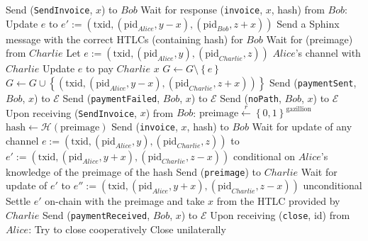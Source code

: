 \begin{algorithmic}[1]
      \State Send (\texttt{SendInvoice}, $x$) to $Bob$
      \State Wait for response (\texttt{invoice}, $x$, hash) from $Bob$:
        \State Update $e$ to $e' := \left(\mathrm{txid},
        \left(\mathrm{pid}_{Alice}, y - x\right),
        \left(\mathrm{pid}_{Bob}, z + x\right)\right)$ 
        \State Send a Sphinx~\cite{sphinx} message with the correct HTLCs (containing
        hash) for $Bob$
        \State {}
        \State Wait for (preimage) from $Charlie$
          \State Let $e := \left(\mathrm{txid}, \left(\mathrm{pid}_{Alice}, y\right),
          \left(\mathrm{pid}_{Charlie}, z\right)\right)$ $Alice$'s channel with $Charlie$
          \State Update $e$ to pay $Charlie$ $x$ 
          \State $G \leftarrow G \setminus \left\{e\right\}$
          \State $G \leftarrow G \cup \left\{\left(\mathrm{txid},
          \left(\mathrm{pid}_{Alice}, y - x\right), \left(\mathrm{pid}_{Charlie}, z +
          x\right)\right)\right\}$
          \State Send (\texttt{paymentSent}, $Bob$, $x$) to $\mathcal{E}$
        \Else
          \State Send (\texttt{paymentFailed}, $Bob$, $x$) to $\mathcal{E}$
        \EndIf
      \Else
        \State Send (\texttt{noPath}, $Bob$, $x$) to $\mathcal{E}$
      \EndIf
    \State
    \State Upon receiving (\texttt{SendInvoice}, $x$) from $Bob$:
      \State $\mathrm{preimage} \overset{r}{\leftarrow}
      \left\{0,1\right\}^{\mathrm{gazillion}}$
      \State $\mathrm{hash} \leftarrow \mathcal{H}\left(\mathrm{preimage}\right)$
      \State Send (\texttt{invoice}, $x$, hash) to $Bob$
      \State Wait for update of any channel $e := \left(\mathrm{txid},
      \left(\mathrm{pid}_{Alice}, y\right), \left(\mathrm{pid}_{Charlie}, z\right)\right)$
      to $e' := \left(\mathrm{txid}, \left(\mathrm{pid}_{Alice}, y + x\right),
      \left(\mathrm{pid}_{Charlie}, z - x\right)\right)$ conditional on $Alice$'s
      knowledge of the preimage of the hash
      \State Send (\texttt{preimage}) to $Charlie$
      \State Wait for update of $e'$ to $e'' := \left(\mathrm{txid},
      \left(\mathrm{pid}_{Alice}, y + x\right), \left(\mathrm{pid}_{Charlie}, z -
      x\right)\right)$ unconditional
        \State Settle $e'$ on-chain with the preimage and take $x$ from the HTLC provided
        by $Charlie$
      \EndIf
      \State Send (\texttt{paymentReceived}, $Bob$, $x$) to $\mathcal{E}$
    \State
    \State Upon receiving (\texttt{close}, id) from $Alice$:
        \State Try to close cooperatively 
         
          \State Close unilaterally 
        \EndIf
      \EndIf
  \end{algorithmic}
